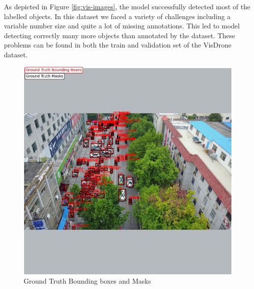 As depicted in Figure \ref{fig:vis-images}, the model successfully detected most of the labelled objects. In this dataset we faced a variety of challenges including
a variable number size and quite a lot of missing annotations. This led to model detecting correctly many more objects than annotated by the dataset. These problems
can be found in both the train and validation set of the VisDrone dataset. 


\begin{figure}[!h]
    \captionsetup{justification=centering}
    \centering
    \begin{minipage}{0.4\textwidth}
      \includegraphics[scale=0.35]{Figures/vis_ground_truth.jpg}
      \caption{Ground Truth Bounding boxes and Masks}
    \end{minipage}
    \hfill
    \begin{minipage}{0.4\textwidth}

\end{minipage}
\end{figure}
